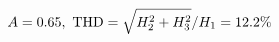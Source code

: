 \documentclass[preview]{standalone}
\begin{document}
\begin{align*}
\special{dvisvgm:raw <g id='unique000'>}A=0.65,\ \text{THD}=\sqrt{H_2^2+H_3^2}/H_1=12.2\%\special{dvisvgm:raw </g>}
\end{align*}
\end{document}
